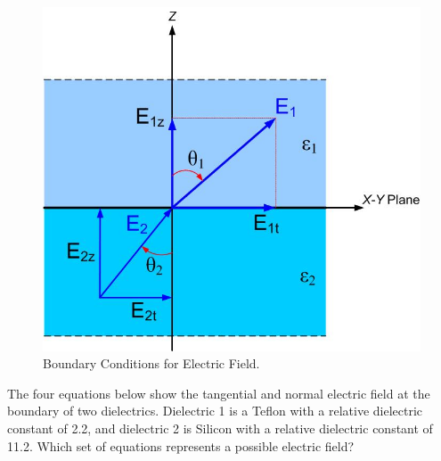 \documentclass{ximera}
\begin{document}
\begin{figure}[htbp]
\begin{center}
\includegraphics[scale=0.4]{../jpg/boundaryconditions.jpg}
\end{center}
\caption{Boundary Conditions for Electric Field.}
\label{fig:BoundaryCondition}
\end{figure}










   \begin{question}
 The four equations below show the tangential and normal electric field at the boundary of two dielectrics. Dielectric 1 is a Teflon with a relative dielectric constant of 2.2, and dielectric 2 is Silicon with a relative dielectric constant of 11.2. Which set of equations represents a possible electric field? 
   \begin{multipleChoice}
   \end{multipleChoice}
   \end{question}
   
\end{document}
